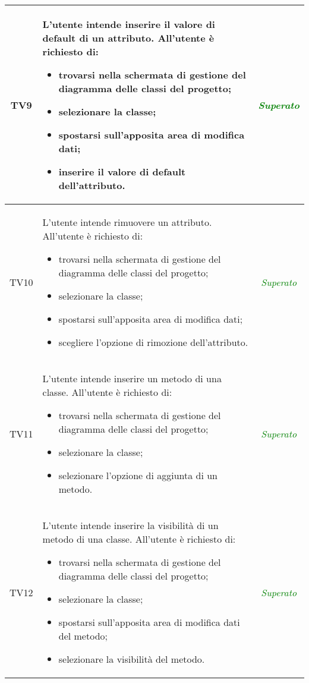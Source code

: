 \begin{longtable}{|c|>{}m{8cm}|c|}
\hypertarget{TV3.1.4.5}{TV9} & L'utente intende inserire il valore di default  di un attributo.
All'utente è richiesto di:
\begin{itemize}
	\item trovarsi nella schermata di gestione del diagramma delle classi del progetto;
	\item selezionare la classe;
	\item spostarsi sull'apposita area di modifica dati;
	\item inserire il valore di default  dell'attributo.
\end{itemize} & \textcolor{Green}{\textit{Superato}}\\ \hline

\hypertarget{TV3.1.5}{TV10} & L'utente intende rimuovere un attributo.
All'utente è richiesto di:
\begin{itemize}
	\item trovarsi nella schermata di gestione del diagramma delle classi del progetto;
	\item selezionare la classe;
	\item spostarsi sull'apposita area di modifica dati;
	\item scegliere l'opzione di rimozione dell'attributo.
\end{itemize} & \textcolor{Green}{\textit{Superato}}\\ \hline

\hypertarget{TV3.1.6}{TV11} & L'utente intende inserire un metodo di una classe.
All'utente è richiesto di:
\begin{itemize}
	\item trovarsi nella schermata di gestione del diagramma delle classi del progetto;
	\item selezionare la classe;
	\item selezionare l'opzione di aggiunta di un metodo.
\end{itemize} & \textcolor{Green}{\textit{Superato}}\\ \hline

\hypertarget{TV3.1.6.1}{TV12} & L'utente intende inserire la visibilità di un metodo di una classe.
All'utente è richiesto di:
\begin{itemize}
	\item trovarsi nella schermata di gestione del diagramma delle classi del progetto;
	\item selezionare la classe;
	\item spostarsi sull'apposita area di modifica dati del metodo;
	\item selezionare la visibilità del metodo.
\end{itemize} & \textcolor{Green}{\textit{Superato}}\\ \hline


\end{longtable}
